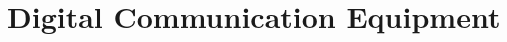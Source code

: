 %
%
%

\chapter{Digital Communication Equipment}

\begin{refsection}



{}
\printbibliography[heading=subbibliography]
\end{refsection}

